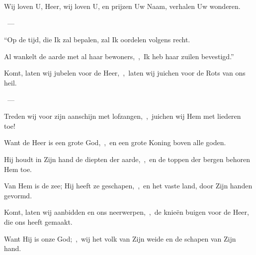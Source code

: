 \documentclass[12pt,twoside,a5paper]{article}
\begin{document}
\begin{halfparskip}
   
\end{halfparskip}

\begin{halfparskip}
  Wij loven U, Heer, wij loven U, en prijzen Uw Naam, verhalen Uw wonderen.

  ~--- 

  ``Op de tijd, die Ik zal bepalen, zal Ik oordelen volgens recht.

  Al wankelt de aarde met al haar bewoners,~\sep\ Ik heb haar zuilen bevestigd.''
\end{halfparskip}

\begin{halfparskip}
   
\end{halfparskip}

\begin{halfparskip}
  Komt, laten wij jubelen voor de Heer,~\sep\ laten wij juichen voor de Rots van ons heil.

  ~--- 

  Treden wij voor zijn aanschijn met lofzangen,~\sep\ juichen wij Hem met liederen toe!

  Want de Heer is een grote God,~\sep\ en een grote Koning boven alle goden.

  Hij houdt in Zijn hand de diepten der aarde,~\sep\ en de toppen der bergen behoren Hem toe.

  Van Hem is de zee; Hij heeft ze geschapen,~\sep\ en het vaste land, door Zijn handen gevormd.

  Komt, laten wij aanbidden en ons neerwerpen,~\sep\ de knieën buigen voor de Heer, die ons heeft gemaakt.

  Want Hij is onze God;~\sep\ wij het volk van Zijn weide en de schapen van Zijn hand.
\end{halfparskip}

\begin{halfparskip}
   
\end{halfparskip}
\end{document}
